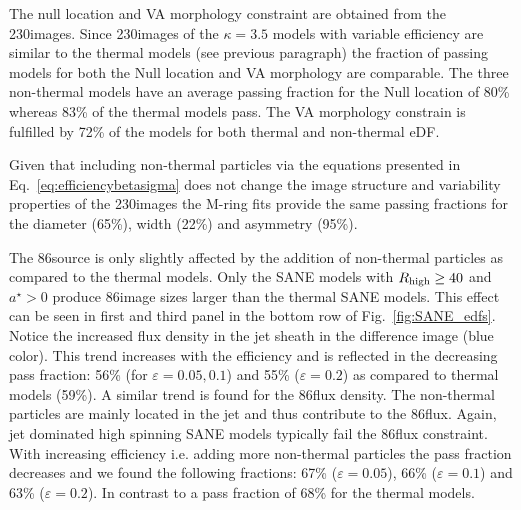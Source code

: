 
The null location and VA morphology constraint are obtained from the 230\GHz images.
Since 230\GHz images of the $\kappa=3.5$ models with variable efficiency are similar to the thermal models (see previous paragraph) the fraction of passing models for both the Null location and VA morphology are comparable.
The three non-thermal models have an average passing fraction for the Null location of 80\% whereas 83\% of the thermal models pass.
The VA morphology constrain is fulfilled by 72\% of the models for both thermal and non-thermal eDF.


Given that including non-thermal particles via the equations presented in Eq.~\ref{eq:efficiencybetasigma} does not change the image structure and variability properties of the 230\GHz images the M-ring fits provide the same passing fractions for the diameter (65\%), width (22\%) and asymmetry (95\%).


The 86\GHz source is only slightly affected by the addition of non-thermal particles as compared to the thermal models.
Only the SANE models with $R_{\rm high}\geq 40$ and $a^{\star}>0$ produce 86\GHz image sizes larger than the thermal SANE models.
This effect can be seen in  first and third panel in the bottom row of Fig.~\ref{fig:SANE_edfs}.
Notice the increased flux density in the jet sheath in the difference image (blue color).
This trend increases with the efficiency and is reflected in the decreasing pass fraction: 56\% (for $\varepsilon=0.05,0.1$) and 55\% ($\varepsilon=0.2$) as compared to thermal models (59\%).
A similar trend is found for the 86\GHz flux density.
The non-thermal particles are mainly located in the jet and thus contribute to the 86\GHz flux.
Again, jet dominated high spinning SANE models typically fail the 86\GHz flux constraint.
With increasing efficiency i.e.
adding more non-thermal particles the pass fraction decreases and we found the following fractions: 67\% ($\varepsilon=0.05$), 66\% ($\varepsilon=0.1$) and 63\% ($\varepsilon=0.2$).
In contrast to a pass fraction of 68\% for the thermal models.

